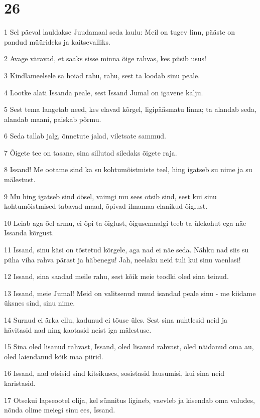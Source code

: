 \chapter{26}

\par 1 Sel päeval lauldakse Juudamaal seda laulu: Meil on tugev linn, pääste on pandud müürideks ja kaitsevalliks.
\par 2 Avage väravad, et saaks sisse minna õige rahvas, kes püsib usus!
\par 3 Kindlameelsele sa hoiad rahu, rahu, sest ta loodab sinu peale.
\par 4 Lootke alati Issanda peale, sest Issand Jumal on igavene kalju.
\par 5 Sest tema langetab need, kes elavad kõrgel, ligipääsmatu linna; ta alandab seda, alandab maani, paiskab põrmu.
\par 6 Seda tallab jalg, õnnetute jalad, viletsate sammud.
\par 7 Õigete tee on tasane, sina sillutad siledaks õigete raja.
\par 8 Issand! Me ootame sind ka su kohtumõistmiste teel, hing igatseb su nime ja su mälestust.
\par 9 Mu hing igatseb sind öösel, vaimgi mu sees otsib sind, sest kui sinu kohtumõistmised tabavad maad, õpivad ilmamaa elanikud õiglust.
\par 10 Leiab aga õel armu, ei õpi ta õiglust, õigusemaalgi teeb ta ülekohut ega näe Issanda kõrgust.
\par 11 Issand, sinu käsi on tõstetud kõrgele, aga nad ei näe seda. Nähku nad siis su püha viha rahva pärast ja häbenegu! Jah, neelaku neid tuli kui sinu vaenlasi!
\par 12 Issand, sina saadad meile rahu, sest kõik meie teodki oled sina teinud.
\par 13 Issand, meie Jumal! Meid on valitsenud muud isandad peale sinu - me kiidame üksnes sind, sinu nime.
\par 14 Surnud ei ärka ellu, kadunud ei tõuse üles. Sest sina nuhtlesid neid ja hävitasid nad ning kaotasid neist iga mälestuse.
\par 15 Sina oled lisanud rahvast, Issand, oled lisanud rahvast, oled näidanud oma au, oled laiendanud kõik maa piirid.
\par 16 Issand, nad otsisid sind kitsikuses, sosistasid lausumisi, kui sina neid karistasid.
\par 17 Otsekui lapseootel olija, kel sünnitus ligineb, vaevleb ja kisendab oma valudes, nõnda olime meiegi sinu ees, Issand.
